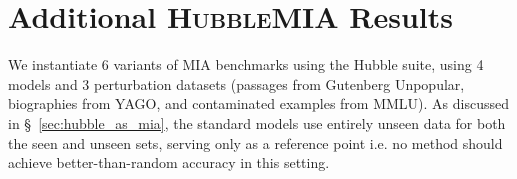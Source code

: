 \newpage
\section{Additional \textsc{HubbleMIA} Results}
\label{app:mia_results}

We instantiate 6 variants of MIA benchmarks using the Hubble suite, using 4 models and 3 perturbation datasets (passages from Gutenberg Unpopular, biographies from YAGO, and contaminated examples from MMLU). As discussed in \S~\ref{sec:hubble_as_mia}, the standard models use entirely unseen data for both the seen and unseen sets, serving only as a reference point i.e. no method should achieve better-than-random accuracy in this setting.


% 





% 